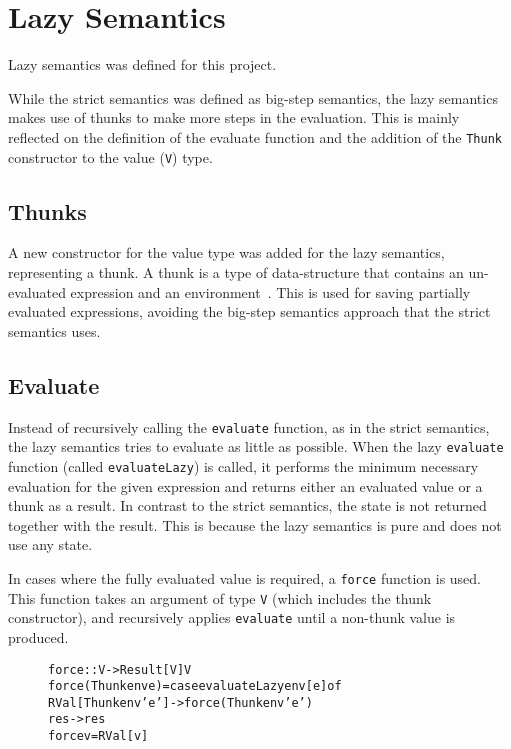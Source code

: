 \section{Lazy Semantics}
\label{LazySem}
Lazy semantics was defined for this project.

While the strict semantics was defined as big-step semantics, the lazy semantics
makes use of thunks to make more steps in the evaluation.
This is mainly reflected on the definition of the evaluate function
and the addition of the \texttt{Thunk} constructor to the value (\texttt{V})
type.

\subsection{Thunks}
A new constructor for the value type was added for the lazy semantics, representing
a thunk. A thunk is a type of data-structure that contains an un-evaluated expression
and an environment~\cite{Takano:2015:TRL:2695664.2695693}. This is used for saving
partially evaluated expressions, avoiding the big-step semantics approach that
the strict semantics uses.

\subsection{Evaluate}
\label{Eval}
Instead of recursively calling the \texttt{evaluate} function, as
in the strict semantics, the lazy semantics tries to evaluate as little as possible.
When the lazy \texttt{evaluate} function (called \texttt{evaluateLazy})
is called, it performs the minimum necessary evaluation
for the given expression and returns either an evaluated value or a thunk as a result.
In contrast to the strict semantics, the state is not returned together with the
result. This is because the lazy semantics is pure and does not use any state.

In cases where the fully evaluated value is required, a \texttt{force} function is used.
This function takes an argument of type \texttt{V} (which includes the thunk constructor),
and recursively applies \texttt{evaluate} until a non-thunk value is produced.

\begin{figure}[!ht]
\begin{alltt}
force :: V -> Result [V] V
force (Thunk env e) = case evaluateLazy env [e] of
  RVal [Thunk env' e'] -> force (Thunk env' e')
  res -> res
force v = RVal [v]
\end{alltt}
\end{figure}

